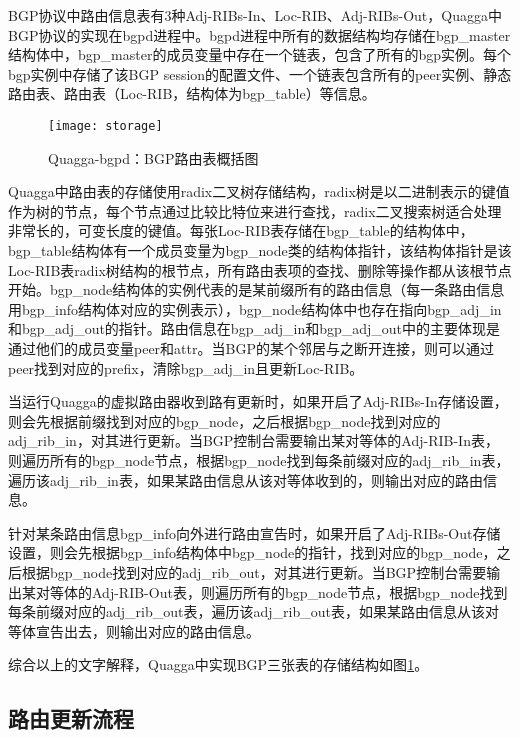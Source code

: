 BGP协议中路由信息表有3种Adj-RIBs-In、Loc-RIB、Adj-RIBs-Out，Quagga中BGP协议的实现在bgpd进程中。bgpd进程中所有的数据结构均存储在bgp\_master结构体中，bgp\_master的成员变量中存在一个链表，包含了所有的bgp实例。每个bgp实例中存储了该BGP session的配置文件、一个链表包含所有的peer实例、静态路由表、路由表（Loc-RIB，结构体为bgp\_table）等信息。


\begin{figure}
  \centering
  \texttt{[image: storage]}
  \caption{Quagga-bgpd：BGP路由表概括图\cite{jakma2014quagga}}
  \label{fig:storage}
\end{figure}

Quagga中路由表的存储使用radix二叉树\cite{quaggaThesis}存储结构，radix树是以二进制表示的键值作为树的节点，每个节点通过比较比特位来进行查找，radix二叉搜索树适合处理非常长的，可变长度的键值。每张Loc-RIB表存储在bgp\_table的结构体中，bgp\_table结构体有一个成员变量为bgp\_node类的结构体指针，该结构体指针是该Loc-RIB表radix树结构的根节点，所有路由表项的查找、删除等操作都从该根节点开始。bgp\_node结构体的实例代表的是某前缀所有的路由信息（每一条路由信息用bgp\_info结构体对应的实例表示），bgp\_node结构体中也存在指向bgp\_adj\_in和bgp\_adj\_out的指针。路由信息在bgp\_adj\_in和bgp\_adj\_out中的主要体现是通过他们的成员变量peer和attr。当BGP的某个邻居与之断开连接，则可以通过peer找到对应的prefix，清除bgp\_adj\_in且更新Loc-RIB。

当运行Quagga的虚拟路由器收到路有更新时，如果开启了Adj-RIBs-In存储设置，则会先根据前缀找到对应的bgp\_node，之后根据bgp\_node找到对应的adj\_rib\_in，对其进行更新。当BGP控制台需要输出某对等体的Adj-RIB-In表，则遍历所有的bgp\_node节点，根据bgp\_node找到每条前缀对应的adj\_rib\_in表，遍历该adj\_rib\_in表，如果某路由信息从该对等体收到的，则输出对应的路由信息。

针对某条路由信息bgp\_info向外进行路由宣告时，如果开启了Adj-RIBs-Out存储设置，则会先根据bgp\_info结构体中bgp\_node的指针，找到对应的bgp\_node，之后根据bgp\_node找到对应的adj\_rib\_out，对其进行更新。当BGP控制台需要输出某对等体的Adj-RIB-Out表，则遍历所有的bgp\_node节点，根据bgp\_node找到每条前缀对应的adj\_rib\_out表，遍历该adj\_rib\_out表，如果某路由信息从该对等体宣告出去，则输出对应的路由信息。

综合以上的文字解释，Quagga中实现BGP三张表的存储结构如图\ref{fig:storage}。
\subsection{路由更新流程}

